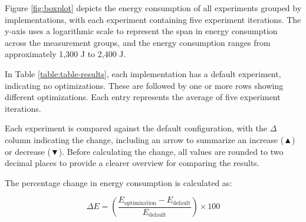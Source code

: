 \documentclass[main.tex]{subfiles}
\begin{document}
Figure \ref{fig:boxplot} depicts the energy consumption of all experiments grouped by implementations, with each experiment containing five experiment iterations. The y-axis uses a logarithmic scale to represent the span in energy consumption across the measurement groups, and the energy consumption ranges from approximately 1,300 J to 2,400 J.



In Table \ref{table:table-results}, each implementation has a default experiment, indicating no optimizations. These are followed by one or more rows showing different optimizations. Each entry represents the average of five experiment iterations.

Each experiment is compared against the default configuration, with the  $\Delta$ column indicating the change, including an arrow to summarize an increase (▲) or decrease (▼). Before calculating the change, all values are rounded to two decimal places to provide a clearer overview for comparing the results.

The percentage change in energy consumption is calculated as:

\[
\Delta E = \left( \frac{E_{\text{optimization}} - E_{\text{default}}}{E_{\text{default}}} \right) \times 100
\]
\end{document}
